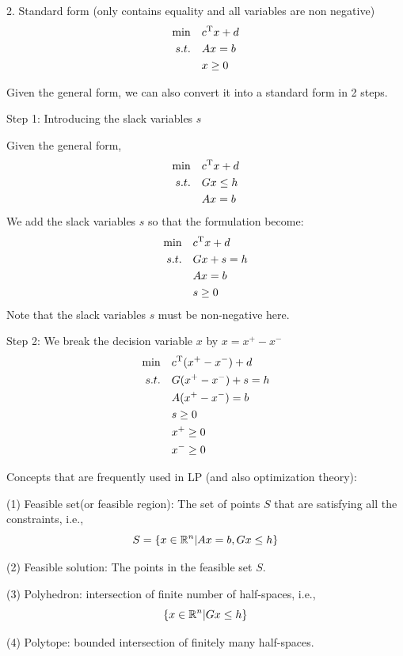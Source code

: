 2. Standard form (only contains equality and all variables are non negative)
\begin{align*}
	\min \quad&c^{{\rm T}}x+d\\
	s.t. \quad&Ax = b\\
	&x\geq 0
\end{align*}

Given the general form, we can also convert it into a standard form in 2 steps.

Step 1: Introducing the slack variables $s$

Given the general form,
\begin{align*}
	\min \quad&c^{{\rm T}}x+d\\
	s.t. \quad&Gx\leq h\\
	&Ax = b
\end{align*}
We add the slack variables $s$ so that the formulation become:
\begin{align*}
	\min \quad&c^{{\rm T}}x+d\\
	s.t. \quad&Gx + s = h\\
	&Ax = b\\
	&s\geq 0
\end{align*}
Note that the slack variables $s$ must be non-negative here.


Step 2: We break the decision variable $x$ by $x= x^+ - x^-$
\begin{align*}
	\min \quad &c^{{\rm T}}(x^{+} - x^{-})+d\\
	s.t. \quad&G(x^{+} - x^{-}) + s = h\\
	&A(x^{+} - x^{-}) = b\\
	&s\geq 0\\
	&x^{+}\geq 0\\
	&x^{-}\geq 0
\end{align*}


Concepts that are frequently used in LP (and also optimization theory):

(1) Feasible set(or feasible region): The set of points $S$ that are satisfying all the constraints, i.e.,
$$S = \{x\in\mathbb{R}^{n}|Ax = b, Gx \leq h \}$$

(2) Feasible solution: The points in the feasible set $S$.

(3) Polyhedron: intersection of finite number of half-spaces, i.e.,
$$\{x\in\mathbb{R}^{n}|Gx\leq h\}$$

(4) Polytope: bounded intersection of finitely many half-spaces.





